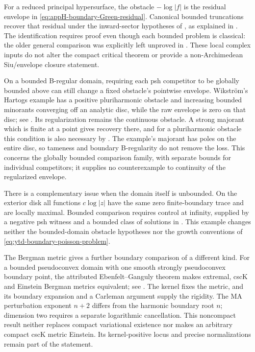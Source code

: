 For a reduced principal hypersurface, the obstacle
\(-\log|f|\) is the residual envelope in
\eqref{eq:appH-boundary-Green-residual}. Canonical bounded truncations
recover that residual under the inward-sector hypotheses of
\cite[Theorem~1.7]{DaoNguyenTran26HypersurfaceGreenV1}, as explained in
. The identification requires proof even
though each bounded problem is classical: the older general comparison
was explicitly left unproved in
\cite[printed~1705]{LarussonSigurdsson01GreenErratum}. These local complex
inputs do not alter the compact critical theorem or provide a
non-Archimedean Siu/envelope closure statement.

On a bounded B-regular domain, requiring each psh competitor to be
globally bounded above can still change a fixed obstacle's pointwise
envelope. Wikstr\"om's Hartogs example has a positive pluriharmonic
obstacle and increasing bounded minorants converging off an analytic
disc, while the raw envelope is zero on that disc; see
.
Its regularization remains the continuous obstacle. A strong majorant
which is finite at a point gives recovery there, and for a pluriharmonic
obstacle this condition is also necessary by
.
The example's majorant has poles on the entire disc, so tameness and
boundary B-regularity do not remove the loss. This concerns the
globally bounded comparison family, with separate bounds for individual
competitors; it supplies no counterexample to continuity of the
regularized envelope.

There is a complementary issue when the domain itself is unbounded.
On the exterior disk all functions \(c\log|z|\) have the same zero
finite-boundary trace and are locally maximal. Bounded comparison
requires control at infinity, supplied by a negative psh witness
and a bounded class of solutions in
. This example changes neither
the bounded-domain obstacle hypotheses nor the growth conventions of
\eqref{eq:ytd-boundary-poisson-problem}.

The Bergman metric gives a further boundary comparison of a
different kind. For a bounded pseudoconvex domain with one smooth
strongly pseudoconvex boundary point, the attributed
Ebenfelt--Ganguly theorem makes extremal, cscK and Einstein Bergman
metrics equivalent; see .
The kernel fixes the metric, and its boundary expansion and a
Carleman argument supply the rigidity. The MA perturbation exponent
$n+2$ differs from the harmonic boundary root $n$; dimension two
requires a separate logarithmic cancellation. This noncompact
result neither replaces compact variational existence nor makes
an arbitrary compact cscK metric Einstein. Its kernel-positive
locus and precise normalizations remain part of the statement.

